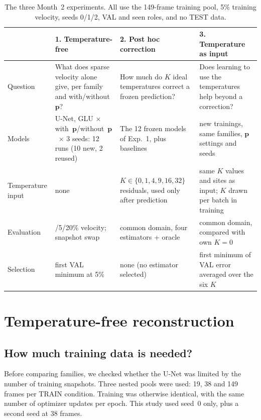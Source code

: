 \documentclass[11pt,letterpaper]{article}
\newcommand{\pon}{with~$\mathbf{p}$}
\newcommand{\poff}{without~$\mathbf{p}$}
\begin{document}
\begin{table}[!htb]
\centering
\caption{The three Month~2 experiments. All use the 149-frame training pool, 5\% training velocity, seeds 0/1/2, VAL and seen roles, and no TEST data.}
\label{tab:design}
\small
\begin{tabularx}{\textwidth}{>{\raggedright\arraybackslash}p{2.6cm}>{\raggedright\arraybackslash}X>{\raggedright\arraybackslash}X>{\raggedright\arraybackslash}X}
\toprule
 & \textbf{1. Temperature-free} & \textbf{2. Post hoc correction} & \textbf{3. Temperature as input} \\
\midrule
Question & What does sparse velocity alone give, per family and with/without $\mathbf{p}$? & How much do $K$ ideal temperatures correct a frozen prediction? & Does learning to use the temperatures help beyond a correction? \\
Models & U-Net, GLU $\times$ \pon/\poff\ $\times$ 3 seeds: 12 runs (10 new, 2 reused) & The 12 frozen models of Exp.~1, plus baselines & 12 new trainings, same families, $\mathbf{p}$ settings and seeds \\
Temperature input & none & $K\in\{0,1,4,9,16,32\}$ residuals, used only after prediction & same $K$ values and sites as input; $K$ drawn per batch in training \\
Evaluation & 1/5/20\% velocity; snapshot swap & common domain, four estimators + oracle & common domain, compared with own $K{=}0$ \\
Selection & first VAL minimum at 5\% & none (no estimator selected) & first minimum of VAL error averaged over the six $K$ \\
\bottomrule
\end{tabularx}
\end{table}

\section{Temperature-free reconstruction}
\label{sec:free}

\subsection{How much training data is needed?}
\label{sec:data}

Before comparing families, we checked whether the U-Net was limited by the number of training snapshots. Three nested pools were used: 19, 38 and 149 frames per TRAIN condition. Training was otherwise identical, with the same number of optimizer updates per epoch. This study used seed~0 only, plus a second seed at 38 frames.
\end{document}
